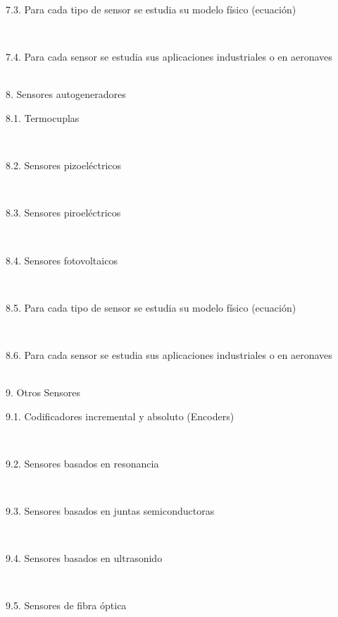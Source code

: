 \documentclass[letterpaper]{article}%
\begin{document}
\begin{tcolorbox}
\hspace*{0.02\linewidth}\parbox{0.98\linewidth}{\strut 7.3. Para cada tipo de sensor se estudia su modelo físico (ecuación)\strut}\\
\hspace*{0.02\linewidth}\parbox{0.98\linewidth}{\strut 7.4. Para cada sensor se estudia sus aplicaciones industriales o en aeronaves\strut}\\
8. Sensores autogeneradores\\
\hspace*{0.02\linewidth}\parbox{0.98\linewidth}{\strut 8.1. Termocuplas\strut}\\
\hspace*{0.02\linewidth}\parbox{0.98\linewidth}{\strut 8.2. Sensores pizoeléctricos\strut}\\
\hspace*{0.02\linewidth}\parbox{0.98\linewidth}{\strut 8.3. Sensores piroeléctricos\strut}\\
\hspace*{0.02\linewidth}\parbox{0.98\linewidth}{\strut 8.4. Sensores fotovoltaicos\strut}\\
\hspace*{0.02\linewidth}\parbox{0.98\linewidth}{\strut 8.5. Para cada tipo de sensor se estudia su modelo físico (ecuación)\strut}\\
\hspace*{0.02\linewidth}\parbox{0.98\linewidth}{\strut 8.6. Para cada sensor se estudia sus aplicaciones industriales o en aeronaves\strut}\\
9. Otros Sensores \\
\hspace*{0.02\linewidth}\parbox{0.98\linewidth}{\strut 9.1. Codificadores incremental y absoluto (Encoders)\strut}\\
\hspace*{0.02\linewidth}\parbox{0.98\linewidth}{\strut 9.2. Sensores basados en resonancia\strut}\\
\hspace*{0.02\linewidth}\parbox{0.98\linewidth}{\strut 9.3. Sensores basados en juntas semiconductoras\strut}\\
\hspace*{0.02\linewidth}\parbox{0.98\linewidth}{\strut 9.4. Sensores basados en ultrasonido\strut}\\
\hspace*{0.02\linewidth}\parbox{0.98\linewidth}{\strut 9.5. Sensores de fibra óptica\strut}\\

\end{tcolorbox}
\end{document}
